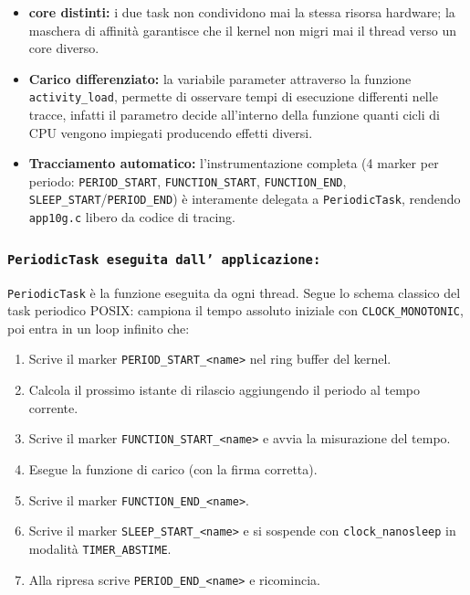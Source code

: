 \begin{itemize}
	\item \textbf{core distinti:} i due task non condividono mai la stessa risorsa hardware; la maschera di affinità garantisce che il kernel non migri mai il thread verso un core diverso.
	\item \textbf{Carico differenziato:} la variabile parameter attraverso la funzione \texttt{activity\_load}, permette di osservare tempi di esecuzione differenti nelle tracce, infatti il parametro decide all'interno della funzione quanti cicli di CPU vengono impiegati producendo effetti diversi.
	\item \textbf{Tracciamento automatico:} l'instrumentazione completa (4 marker per periodo: \texttt{PERIOD\_START}, \texttt{FUNCTION\_START}, \texttt{FUNCTION\_END}, \texttt{SLEEP\_START}/\texttt{PERIOD\_END}) è interamente delegata a \texttt{PeriodicTask}, rendendo \texttt{app10g.c} libero da codice di tracing.
\end{itemize}



\subsubsection{\texttt{PeriodicTask eseguita dall' applicazione:}}
\label{activity_library}

\texttt{PeriodicTask} è la funzione eseguita da ogni thread.
Segue lo schema classico del task periodico POSIX: campiona il tempo assoluto iniziale con \texttt{CLOCK\_MONOTONIC}, poi entra in un loop infinito che:

\begin{enumerate}
	\item Scrive il marker \texttt{PERIOD\_START\_<name>} nel ring buffer del kernel.
	\item Calcola il prossimo istante di rilascio aggiungendo il periodo al tempo corrente.
	\item Scrive il marker \texttt{FUNCTION\_START\_<name>} e avvia la misurazione del tempo.
	\item Esegue la funzione di carico (con la firma corretta).
	\item Scrive il marker \texttt{FUNCTION\_END\_<name>}.
	\item Scrive il marker \texttt{SLEEP\_START\_<name>} e si sospende con \texttt{clock\_nanosleep} in modalità \texttt{TIMER\_ABSTIME}.
	\item Alla ripresa scrive \texttt{PERIOD\_END\_<name>} e ricomincia.
\end{enumerate}

